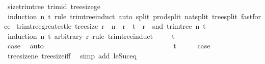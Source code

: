 \begin{isabellebody}
%
\isatagproof
{}\isamarkupfalse%
\ size{\isacharunderscore}{\kern0pt}trim{\isacharunderscore}{\kern0pt}tree\ trim{\isacharunderscore}{\kern0pt}id\ tree{\isacharunderscore}{\kern0pt}size{\isacharunderscore}{\kern0pt}ge{\isacharunderscore}{\kern0pt}{}\isanewline
\ \ \isamarkupfalse%
\ {\isacharparenleft}{\kern0pt}induction\ n\ t\ rule{\isacharcolon}{\kern0pt}\ trim{\isacharunderscore}{\kern0pt}tree{\isachardot}{\kern0pt}induct{\isacharcomma}{\kern0pt}\ auto\ split{\isacharcolon}{\kern0pt}\ prod{\isachardot}{\kern0pt}split\ nat{\isachardot}{\kern0pt}split\ tree{\isachardot}{\kern0pt}split{\isacharcomma}{\kern0pt}\ fastforce{\isacharplus}{\kern0pt}{\isacharparenright}{\kern0pt}%
\endisatagproof
{\isafoldproof}%
%
\isadelimproof
\isanewline
%
\endisadelimproof
\isanewline
{}\isamarkupfalse%
\ trim{\isacharunderscore}{\kern0pt}tree{\isacharunderscore}{\kern0pt}greatest{\isacharunderscore}{\kern0pt}le{\isacharcolon}{\kern0pt}\ {\isachardoublequoteopen}tree{\isacharunderscore}{\kern0pt}size\ r\ {\isasymle}\ n\ {\isasymLongrightarrow}\ r\ {\isasymle}\ t\ {\isasymLongrightarrow}\ r\ {\isasymle}\ snd\ {\isacharparenleft}{\kern0pt}trim{\isacharunderscore}{\kern0pt}tree\ n\ t{\isacharparenright}{\kern0pt}{\isachardoublequoteclose}\isanewline
%
\isadelimproof
%
\endisadelimproof
%
\isatagproof
{}\isamarkupfalse%
\ {\isacharparenleft}{\kern0pt}induction\ n\ t\ arbitrary{\isacharcolon}{\kern0pt}\ r\ rule{\isacharcolon}{\kern0pt}\ trim{\isacharunderscore}{\kern0pt}tree{\isachardot}{\kern0pt}induct{\isacharparenright}{\kern0pt}\isanewline
\ \ \isamarkupfalse%
\ {\isacharparenleft}{\kern0pt}{}\ t{\isacharparenright}{\kern0pt}\ \ \ \ \ \ \ \ \ \ \ \ \ \ \ \ \ \ \ \isanewline
\ \ \isamarkupfalse%
\ \isamarkupfalse%
\ {\isacharquery}{\kern0pt}case\ \isamarkupfalse%
\ auto\ \ \ \ \ \ \ \ \ \ \ \ \ \ \ \ \ \ \ \ \ \ \ \ \ \ \ \ \ \ \ \isanewline
{}\isamarkupfalse%
\isanewline
\ \ \isamarkupfalse%
\ {\isacharparenleft}{\kern0pt}{}\ t{\isacharparenright}{\kern0pt}\isanewline
\ \ \isamarkupfalse%
\ \isamarkupfalse%
\ {\isacharquery}{\kern0pt}case\ \isamarkupfalse%
\ tree{\isacharunderscore}{\kern0pt}size{\isacharunderscore}{\kern0pt}ne{\isacharunderscore}{\kern0pt}{}\ tree{\isacharunderscore}{\kern0pt}size{\isacharunderscore}{\kern0pt}{}{\isacharunderscore}{\kern0pt}iff\ \isamarkupfalse%
\ {\isacharparenleft}{\kern0pt}simp\ add{\isacharcolon}{\kern0pt}\ le{\isacharunderscore}{\kern0pt}Suc{\isacharunderscore}{\kern0pt}eq{\isacharparenright}{\kern0pt}\isanewline

\end{isabellebody}
